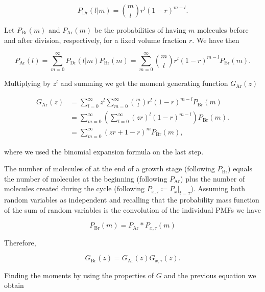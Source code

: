 \begin{equation}
  P_\text{Dr}(l|m) = {m\choose l}r^l(1-r)^{m-l}.
\end{equation}

Let $P_\text{Br}(m)$ and $P_\text{Ar}(m)$ be the probabilities of having $m$ molecules before and after division, respectively, for a fixed volume fraction $r$. We have then

\begin{equation}
  P_\text{Ar}(l) = \sum_{m=0}^\infty P_\text{Dr}(l|m)P_\text{Br}(m) = \sum_{m=0}^\infty {m\choose l}r^l(1-r)^{m-l}P_\text{Br}(m).
\end{equation}

Multiplying by $z^l$ and summing we get the moment generating function $G_\text{Ar}(z)$

\begin{equation}
  \label{eq:binomG}
  \begin{split}
    G_\text{Ar}(z) &= \sum_{l=0}^\infty z^l\sum_{m=0}^\infty {m\choose l}r^l(1-r)^{m-l}P_\text{Br}(m)\\
    &= \sum_{m=0}^\infty\left(\sum_{l=0}^\infty (zr)^l(1-r)^{m-l}\right)P_\text{Br}(m).\\
    &= \sum_{m=0}^\infty(zr+1-r)^{m}P_\text{Br}(m),
  \end{split}
\end{equation}

where we used the binomial expansion formula on the last step.

The number of molecules of at the end of a growth stage (following $P_\text{Br}$) equals the number of molecules at the beginning (following $P_\text{Ar}$) plus the number of molecules created during the cycle (following $P_{x,\tau} \coloneqq P_x|_{t=\tau}$). Assuming both random variables as independent and recalling that the probability mass function of the sum of random variables is the convolution of the individual PMFs we have

\begin{equation*}
  P_\text{Br}(m) = P_\text{Ar}\ast P_{x,\tau}(m)
\end{equation*}

Therefore,

\begin{equation}
  G_\text{Br}(z) = G_\text{Ar}(z)G_{x,\tau}(z).
\end{equation}

Finding the moments by using the properties of $G$ and the previous equation we obtain

